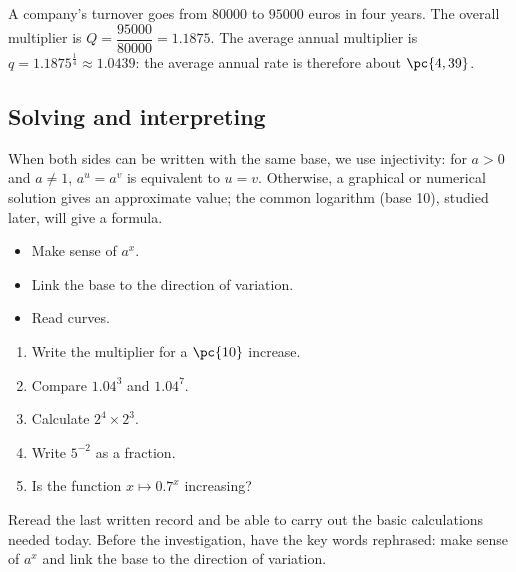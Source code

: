 \begin{example}
A company's turnover goes from $\num{80000}$ to $\num{95000}$ euros in four years. The overall multiplier is $Q=\dfrac{\num{95000}}{\num{80000}}=\num{1,1875}$. The average annual multiplier is $q=\num{1,1875}^{\frac14}\approx\num{1,0439}$: the average annual rate is therefore about $\pc{4,39}$.
\end{example}

\subsection{Solving and interpreting}
When both sides can be written with the same base, we use injectivity: for $a>0$ and $a\neq1$, $a^u=a^v$ is equivalent to $u=v$. Otherwise, a graphical or numerical solution gives an approximate value; the common logarithm (base 10), studied later, will give a formula.

\begin{objectives}\begin{itemize}\item Make sense of $a^x$.\item Link the base to the direction of variation.\item Read curves.\end{itemize}\end{objectives}
\begin{fluency}\begin{enumerate}\item Write the multiplier for a $\pc{10}$ increase. \item Compare $\num{1,04}^3$ and $\num{1,04}^7$. \item Calculate $2^4\times2^3$. \item Write $5^{-2}$ as a fraction. \item Is the function $x\mapsto\num{0,7}^x$ increasing? \end{enumerate}\end{fluency}
\begin{prerequisites}Reread the last written record and be able to carry out the basic calculations needed today. Before the investigation, have the key words rephrased: make sense of $a^x$ and link the base to the direction of variation.\end{prerequisites}

